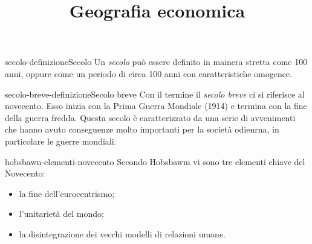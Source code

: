 \documentclass[preview]{standalone}
\begin{document}
\title{Geografia economica}
\genpage

\begin{snippetdefinition}{secolo-definizione}{Secolo}
    Un \textit{secolo} può essere definito in mainera stretta come 100 anni,
    oppure come un periodo di circa 100 anni con caratteristiche omogenee.
\end{snippetdefinition}

\begin{snippetdefinition}{secolo-breve-definizione}{Secolo breve}
    Con il termine il \textit{secolo breve} ci si riferisce al novecento.
    Esso inizia con la Prima Guerra Mondiale (1914) e termina con la fine della guerra fredda.
    Questa secolo è caratterizzato da una serie di avvenimenti che hanno avuto conseguenze molto importanti
    per la società odienrna, in particolare le guerre mondiali.
\end{snippetdefinition}

\begin{snippet}{hobsbawn-elementi-novecento}
    Secondo Hobsbawm vi sono tre elementi chiave del Novecento:
    \begin{itemize}
        \item la fine dell'eurocentrismo;
        \item l'unitarietà del mondo;
        \item la disintegrazione dei vecchi modelli di relazioni umane.
    \end{itemize}
\end{snippet}
\end{document}
